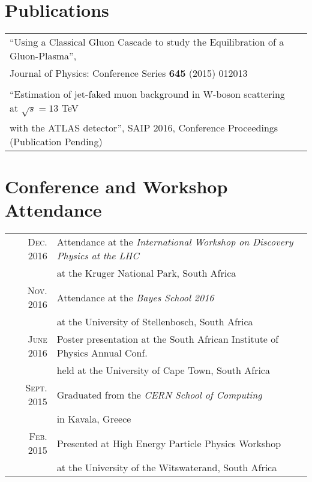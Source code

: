 \documentclass[a4paper,10pt]{article} %
\begin{document}

\section{Publications}

\begin{tabular}{ll}
``Using a Classical Gluon Cascade to study the Equilibration of a Gluon-Plasma'', \\
Journal of Physics: Conference Series \textbf{645} (2015) 012013 \\
\\
``Estimation of jet-faked muon background in W-boson scattering at $\sqrt{s} = 13$ TeV\\
 with the ATLAS detector'', SAIP 2016, Conference Proceedings (Publication Pending)
\end{tabular}


\section{Conference and Workshop Attendance}
\begin{tabular}{rl}
\textsc{Dec.} 2016 & Attendance at the \textit{International Workshop on Discovery Physics at the LHC} \\
& at the Kruger National Park, South Africa \\

\textsc{Nov.} 2016 & Attendance at the \textit{Bayes School 2016} \\
& at the University of Stellenbosch, South Africa \\

\textsc{June} 2016 & Poster presentation at the South African Institute of Physics Annual Conf. \\
& held at the University of Cape Town, South Africa \\ 

\textsc{Sept.} 2015 & Graduated from the \textit{CERN School of Computing} \\
& in Kavala, Greece \\

\textsc{Feb.} 2015 & Presented at High Energy Particle Physics Workshop \\
& at the University of the Witswaterand, South Africa \\

\end{tabular}
\end{document}
